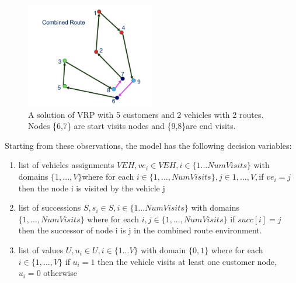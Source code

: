 \begin{figure}[h]
    \centering
    \includegraphics[width=0.5\textwidth]{images/combined-route-solution.png}
    \caption{A solution of VRP with 5 customers and 2 vehicles with 2 routes. Nodes \{6,7\} are start visits nodes and \{9,8\}are end visits.}
    \label{fig:mesh1}
\end{figure}

Starting from these observations, the model has the following decision variables:
\begin{enumerate}
    \item list of vehicles assignments \begin{math}VEH, ve_{i} \in VEH, i \in \{1...NumVisits\}\end{math} with domains \begin{math}\{1,...,V\}\end{math}where for each \begin{math}i \in \{1,..., NumVisits\}, j \in {1,...,V} ,\end{math}if \begin{math} ve_{i} = j\end{math} then the node i is visited by the vehicle j
    \item list of successions \begin{math}S, s_{i} \in S, i \in \{1...NumVisits\}\end{math} with domains \begin{math}\{1,..., NumVisits\}\end{math} where for each \begin{math}i,j \in \{1,..., NumVisits\}\end{math} if \begin{math}succ[i] = j\end{math} then the successor of node i is j in the combined route environment. 
    \item list of values \begin{math}U, u_{i} \in U, i \in \{1...V\}\end{math} with domain \begin{math}\{0,1\}\end{math} where for each \begin{math}i \in \{1,...,V\}\end{math} if \begin{math}u_{i} = 1 \end{math} then the vehicle visits at least one customer node, \begin{math} u_{i} = 0\end{math} otherwise
\end{enumerate}
\newpage
